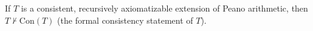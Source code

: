 If $T$ is a consistent, recursively axiomatizable extension of Peano arithmetic, then $T \nvdash \text{Con}(T)$ (the formal consistency statement of $T$).
